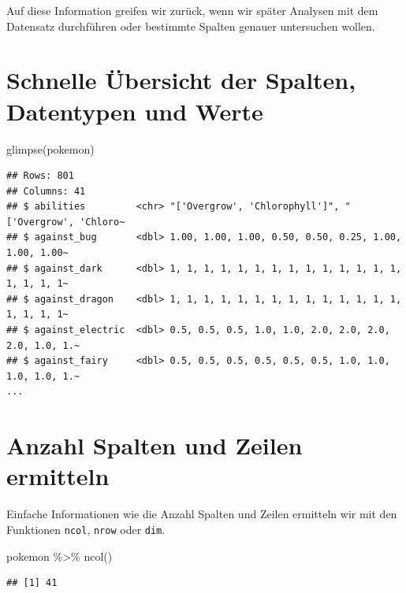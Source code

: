 \documentclass[
]{book}
\newenvironment{Shaded}{\begin{snugshade}}{\end{snugshade}}
\newcommand{\FunctionTok}[1]{\textcolor[rgb]{0.00,0.00,0.00}{#1}}
\newcommand{\NormalTok}[1]{#1}
\newcommand{\SpecialCharTok}[1]{\textcolor[rgb]{0.00,0.00,0.00}{#1}}
\begin{document}
Auf diese Information greifen wir zurück, wenn wir später Analysen mit dem Datensatz durchführen oder bestimmte Spalten genauer untersuchen wollen.

\hypertarget{schnelle-uxfcbersicht-der-spalten-datentypen-und-werte}{%
\section{Schnelle Übersicht der Spalten, Datentypen und Werte}\label{schnelle-uxfcbersicht-der-spalten-datentypen-und-werte}}

\begin{Shaded}
\begin{Highlighting}[]
\FunctionTok{glimpse}\NormalTok{(pokemon)}
\end{Highlighting}
\end{Shaded}

\begin{verbatim}
## Rows: 801
## Columns: 41
## $ abilities         <chr> "['Overgrow', 'Chlorophyll']", "['Overgrow', 'Chloro~
## $ against_bug       <dbl> 1.00, 1.00, 1.00, 0.50, 0.50, 0.25, 1.00, 1.00, 1.00~
## $ against_dark      <dbl> 1, 1, 1, 1, 1, 1, 1, 1, 1, 1, 1, 1, 1, 1, 1, 1, 1, 1~
## $ against_dragon    <dbl> 1, 1, 1, 1, 1, 1, 1, 1, 1, 1, 1, 1, 1, 1, 1, 1, 1, 1~
## $ against_electric  <dbl> 0.5, 0.5, 0.5, 1.0, 1.0, 2.0, 2.0, 2.0, 2.0, 1.0, 1.~
## $ against_fairy     <dbl> 0.5, 0.5, 0.5, 0.5, 0.5, 0.5, 1.0, 1.0, 1.0, 1.0, 1.~
...
\end{verbatim}

\hypertarget{anzahl-spalten-zeilen}{%
\section{Anzahl Spalten und Zeilen ermitteln}\label{anzahl-spalten-zeilen}}

Einfache Informationen wie die Anzahl Spalten und Zeilen ermitteln wir mit den Funktionen \texttt{ncol}, \texttt{nrow} oder \texttt{dim}.

\begin{Shaded}
\begin{Highlighting}[]
\NormalTok{pokemon }\SpecialCharTok{\%\textgreater{}\%}
  \FunctionTok{ncol}\NormalTok{()}
\end{Highlighting}
\end{Shaded}

\begin{verbatim}
## [1] 41
\end{verbatim}
\end{document}
